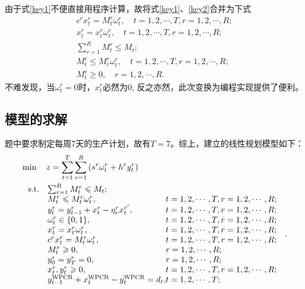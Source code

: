 	由于式\ref{key1}不便直接用程序计算，故将式\ref{key1}、\ref{key2}合并为下式\cite{姜启源2011数学模型}
	\begin{equation}
		\begin{array}{c}\label{修正式}
c^{r} x_{t}^{r}=M_{t}^{r} \omega_{t}^{r}, \quad t=1,2, \cdots, T, r=1,2, \cdots, R; \\
x_{t}^{r}=x_{t}^{r} \omega_{t}^{r},\quad t=1,2, \cdots, T, r=1,2, \cdots, R;\\
\sum_{r=1}^{R} M_{t}^{r} \leqslant M_{t}; \\
M_{t}^{r} \leqslant M_{t}^{r} \omega_{t}^{r}, \quad t=1,2, \cdots, T, r=1,2, \cdots, R;\\
M_{t}^{r} \geqslant 0,\quad  r=1,2, \cdots, R.
\end{array}
	\end{equation}
	不难发现，当$\omega_{t}^{r} = 0$时，$x_{t}^{r}$必然为0, 反之亦然，此次变换为编程实现提供了便利。


\subsection{模型的求解} %
\label{sub:模型的求解}

题中要求制定每周7天的生产计划，故有$T = 7$。综上，建立的线性规划模型如下：
\begin{equation}\label{总模型}
	\begin{aligned}
&\min \quad z  = \sum_{t  = 1}^{T} \sum_{r = 1}^{R}\left(s^{r} \omega_{t}^{r}+h^{r} y_{t}^{r}\right)\\
& \ \begin{array}{r@{\quad}l@{}l@{\quad}l}
\mathrm{s.t. } 	&\sum_{r=1}^{R} M_{t}^{r} \leqslant M_{t}; &\\
&M_{t}^{r} \leqslant M_{t}^{r} \omega_{t}^{r}, &t=1,2, \cdots, T, r=1,2, \cdots, R;\\
& y_{t}^{r}=y_{t-1}^{r}+x_{t}^{r}-\eta_{r}^{r} x_{t}^{r^{\prime}}, &t=1,2, \cdots, T,  r=1,2, \cdots, R; \\
&\omega_{t}^{r} \in\{0,1\}, &t=1,2, \cdots, T, r=1,2, \cdots, R; \\
&x_{t}^{r}=x_{t}^{r} \omega_{t}^{r},& t=1,2, \cdots, T, r=1,2, \cdots, R;\\
&c^{r} x_{t}^{r}=M_{t}^{r} \omega_{t}^{r}, &t=1,2, \cdots, T, r=1,2, \cdots, R; \\
&M_{t}^{r} \geqslant 0,& r=1,2, \cdots, R ;\\
&y_{0}^{r}=y_{T}^{r}=0,& r=1,2, \cdots, R ;\\
&x_{t}^{r}, y_{t}^{r} \geqslant 0, &t=1,2, \cdots, T, r=1,2, \cdots, R;\\
&y_{t-1}^{\mathrm{WPCR}}+x_{t}^{\mathrm{WPCR}}-y_{t}^{\mathrm{WPCR}}=d_{t}, & t=1,2, \cdots, T; \\
\end{array}.
\end{aligned}
\end{equation}



